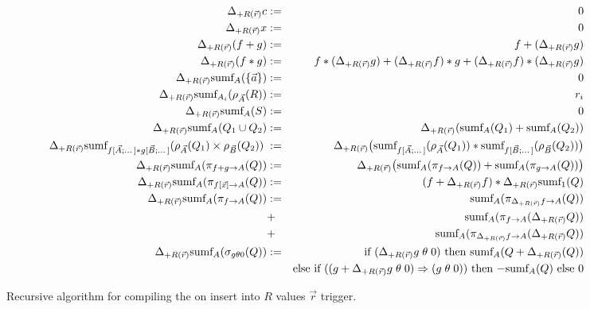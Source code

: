 \documentclass{vldb}
\begin{document}
\begin{figure}[t!]
\begin{eqnarray*}
\Delta_{+R(\vec{r})} c       &:=& 0 \\
\Delta_{+R(\vec{r})} x       &:=& 0 \\
\Delta_{+R(\vec{r})} (f + g) &:=&         f                + (\Delta_{+R(\vec{r})} g) \\
\Delta_{+R(\vec{r})} (f * g) &:=& f * (\Delta_{+R(\vec{r})} g) 
                              +   (\Delta_{+R(\vec{r})} f) * g                        
                              +   (\Delta_{+R(\vec{r})} f) * (\Delta_{+R(\vec{r})} g)
\\
\Delta_{+R(\vec{r})} \mbox{sumf}_A(\{ \vec{a} \}) &:=& 0
\\
\Delta_{+R(\vec{r})} \mbox{sumf}_{A_i}(\rho_{\vec{A}}(R)) &:=& r_i
\\
\Delta_{+R(\vec{r})} \mbox{sumf}_A(S) &:=& 0
\\
\Delta_{+R(\vec{r})}  \mbox{sumf}_A(Q_1 \cup Q_2) &:=&
\Delta_{+R(\vec{r})} (\mbox{sumf}_A(Q_1) + \mbox{sumf}_A(Q_2))
\\
\Delta_{+R(\vec{r})} \mbox{sumf}_{f[\vec{A};\dots] * g[\vec{B};\dots]}(\rho_{\vec{A}}(Q_1) \times \rho_{\vec{B}}(Q_2)) \; &:=&
\Delta_{+R(\vec{r})} \big( \mbox{sumf}_{f[\vec{A};\dots]}(\rho_{\vec{A}}(Q_1))
    * \mbox{sumf}_{f[\vec{B};\dots]}(\rho_{\vec{B}}(Q_2)) \big)
\\
\Delta_{+R(\vec{r})} \mbox{sumf}_A(\pi_{f + g \rightarrow A}(Q)) &:=&
\Delta_{+R(\vec{r})} \big( \mbox{sumf}_A(\pi_{f \rightarrow A}(Q))
   + \mbox{sumf}_A(\pi_{g \rightarrow A}(Q)) \big)
\\
\Delta_{+R(\vec{r})} \mbox{sumf}_A(\pi_{f[\vec{x}] \rightarrow A}(Q)) &:=&
   (f + \Delta_{+R(\vec{r})} f)
   * \Delta_{+R(\vec{r})} \mbox{sumf}_1(Q)
\\
\Delta_{+R(\vec{r})} \mbox{sumf}_A(\pi_{f \rightarrow A}(Q)) &:=&
   \mbox{sumf}_A(\pi_{\Delta_{+R(\vec{r})} f \rightarrow A}(Q)) \\
   &+& \mbox{sumf}_A(\pi_{f \rightarrow A}(\Delta_{+R(\vec{r})} Q)) \\
   &+& \mbox{sumf}_A(\pi_{\Delta_{+R(\vec{r})} f \rightarrow A}(\Delta_{+R(\vec{r})} Q))
\\
\Delta_{+R(\vec{r})} \mbox{sumf}_A(\sigma_{g \theta 0}(Q)) &:=&
\mbox{if ($\Delta_{+R(\vec{r})} g \;\theta\; 0$) then
   $\mbox{sumf}_A(Q + \Delta_{+R(\vec{r})}(Q))$} \\
&& \mbox{else if ($(g + \Delta_{+R(\vec{r})} g \;\theta\; 0) \Rightarrow
(g \;\theta\; 0)$) then $- \mbox{sumf}_A(Q)$ else 0}
\end{eqnarray*}
%
\caption{Recursive algorithm for compiling the
on insert into $R$ values $\vec{r}$ trigger.}
\label{fig:mainalg}
\end{figure}
\end{document}
